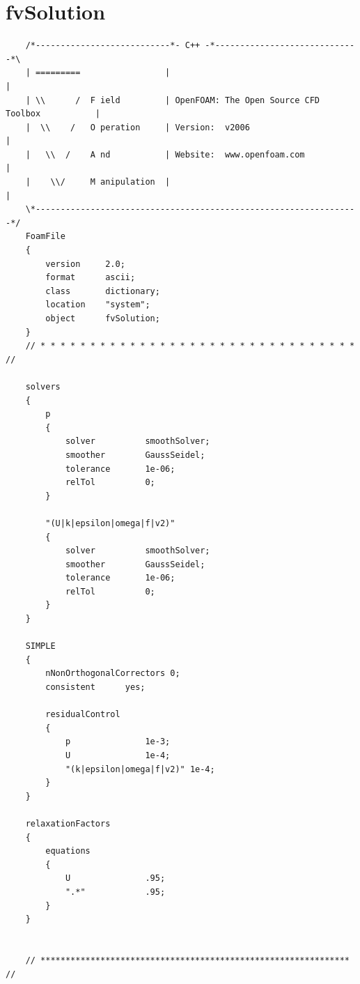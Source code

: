 \documentclass[a4paper,12pt]{report}
\theoremstyle{remark}
\begin{document}
\newpage
\appendix
{\let\clearpage\relax \chapter{fvSolution}\label{app:fvsol}}
\begin{verbatim}
	/*---------------------------*- C++ -*-----------------------------*\
	| =========                 |                                                 |
	| \\      /  F ield         | OpenFOAM: The Open Source CFD Toolbox           |
	|  \\    /   O peration     | Version:  v2006                                 |
	|   \\  /    A nd           | Website:  www.openfoam.com                      |
	|    \\/     M anipulation  |                                                 |
	\*-----------------------------------------------------------------*/
	FoamFile
	{
		version     2.0;
		format      ascii;
		class       dictionary;
		location    "system";
		object      fvSolution;
	}
	// * * * * * * * * * * * * * * * * * * * * * * * * * * * * * * * * //
	
	solvers
	{
		p
		{
			solver          smoothSolver;
			smoother        GaussSeidel;
			tolerance       1e-06;
			relTol          0; 
		}
		
		"(U|k|epsilon|omega|f|v2)"
		{
			solver          smoothSolver;
			smoother        GaussSeidel;
			tolerance       1e-06;
			relTol          0; 
		}
	}
	
	SIMPLE
	{
		nNonOrthogonalCorrectors 0;
		consistent      yes;
		
		residualControl
		{
			p               1e-3;
			U               1e-4;
			"(k|epsilon|omega|f|v2)" 1e-4;
		}
	}
	
	relaxationFactors
	{
		equations
		{
			U               .95; 
			".*"            .95;
		}
	}
	
	
	// ************************************************************** //
\end{verbatim}
	
\end{document}
